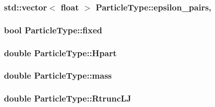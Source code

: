 \subsubsection[{\texorpdfstring{epsilon\+\_\+pairs}{epsilon_pairs}}]{\setlength{\rightskip}{0pt plus 5cm}std\+::vector$<$ float $>$ Particle\+Type\+::epsilon\+\_\+pairs\hspace{0.3cm}{\ttfamily [static]}, {\ttfamily [private]}}\hypertarget{classParticleType_a143dfdb6d3408d5f4f710e5ccc9e0c49}{}\label{classParticleType_a143dfdb6d3408d5f4f710e5ccc9e0c49}
\subsubsection[{\texorpdfstring{fixed}{fixed}}]{\setlength{\rightskip}{0pt plus 5cm}bool Particle\+Type\+::fixed\hspace{0.3cm}{\ttfamily [private]}}\hypertarget{classParticleType_acfda1ab133ca64961b06074acff72897}{}\label{classParticleType_acfda1ab133ca64961b06074acff72897}
\subsubsection[{\texorpdfstring{Hpart}{Hpart}}]{\setlength{\rightskip}{0pt plus 5cm}double Particle\+Type\+::\+Hpart\hspace{0.3cm}{\ttfamily [private]}}\hypertarget{classParticleType_aae4f7e0cd2265895a5bafaff24b443fb}{}\label{classParticleType_aae4f7e0cd2265895a5bafaff24b443fb}
\subsubsection[{\texorpdfstring{mass}{mass}}]{\setlength{\rightskip}{0pt plus 5cm}double Particle\+Type\+::mass\hspace{0.3cm}{\ttfamily [private]}}\hypertarget{classParticleType_a50e29ce810f7695975cd1783fc39d123}{}\label{classParticleType_a50e29ce810f7695975cd1783fc39d123}
\subsubsection[{\texorpdfstring{Rtrunc\+LJ}{RtruncLJ}}]{\setlength{\rightskip}{0pt plus 5cm}double Particle\+Type\+::\+Rtrunc\+LJ\hspace{0.3cm}{\ttfamily [private]}}\hypertarget{classParticleType_a5bcb4a735490f24a0c764e7a866ef39f}{}\label{classParticleType_a5bcb4a735490f24a0c764e7a866ef39f}
